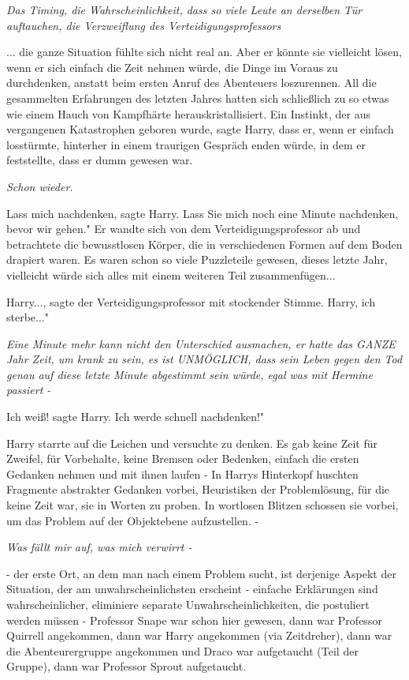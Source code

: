 \emph{Das Timing, die Wahrscheinlichkeit, dass so viele Leute an derselben Tür auftauchen, die Verzweiflung des Verteidigungsprofessors}

... die ganze Situation fühlte sich nicht real an. Aber er könnte sie vielleicht
lösen, wenn er sich einfach die Zeit nehmen würde, die Dinge im Voraus zu
durchdenken, anstatt beim ersten Anruf des Abenteuers loszurennen. All die
gesammelten Erfahrungen des letzten Jahres hatten sich schließlich zu so etwas
wie einem Hauch von Kampfhärte herauskristallisiert. Ein Instinkt, der aus
vergangenen Katastrophen geboren wurde, sagte Harry, dass er, wenn er einfach
losstürmte, hinterher in einem traurigen Gespräch enden würde, in dem er
feststellte, dass er dumm gewesen war.

\emph{Schon wieder.}

\glqq Lass mich nachdenken\grqq{}, sagte Harry. \glqq Lass Sie mich noch eine
Minute nachdenken, bevor wir gehen." Er wandte sich von dem
Verteidigungsprofessor ab und betrachtete die bewusstlosen Körper, die in
verschiedenen Formen auf dem Boden drapiert waren. Es waren schon so viele
Puzzleteile gewesen, dieses letzte Jahr, vielleicht würde sich alles mit einem
weiteren Teil zusammenfügen...

\glqq Harry...\grqq{}, sagte der Verteidigungsprofessor mit stockender Stimme.
\glqq Harry, ich sterbe..."

\emph{Eine Minute mehr kann nicht den Unterschied ausmachen, er hatte das GANZE Jahr Zeit, um krank zu sein, es ist UNMÖGLICH, dass sein Leben gegen den Tod genau auf diese letzte Minute abgestimmt sein würde, egal was mit Hermine passiert -}

\glqq Ich weiß!\grqq{} sagte Harry. \glqq Ich werde schnell nachdenken!"

Harry starrte auf die Leichen und versuchte zu denken. Es gab keine Zeit für
Zweifel, für Vorbehalte, keine Bremsen oder Bedenken, einfach die ersten
Gedanken nehmen und mit ihnen laufen - In Harrys Hinterkopf huschten Fragmente
abstrakter Gedanken vorbei, Heuristiken der Problemlösung, für die keine Zeit
war, sie in Worten zu proben. In wortlosen Blitzen schossen sie vorbei, um das
Problem auf der Objektebene aufzustellen. -

\emph{Was fällt mir auf, was mich verwirrt - }

- der erste Ort, an dem man nach einem Problem sucht, ist derjenige Aspekt der
Situation, der am unwahrscheinlichsten erscheint - einfache Erklärungen sind
wahrscheinlicher, eliminiere separate Unwahrscheinlichkeiten, die postuliert
werden müssen - Professor Snape war schon hier gewesen, dann war Professor
Quirrell angekommen, dann war Harry angekommen (via Zeitdreher), dann war die
Abenteurergruppe angekommen und Draco war aufgetaucht (Teil der Gruppe), dann
war Professor Sprout aufgetaucht.

